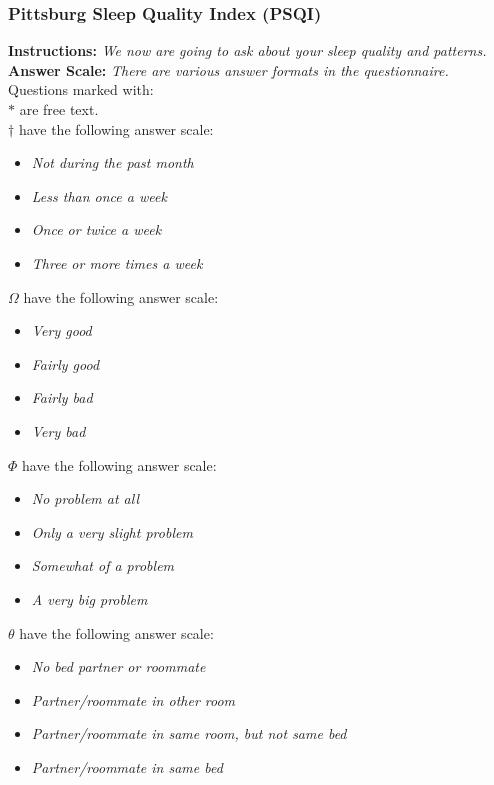 \subsubsection{Pittsburg Sleep Quality Index (PSQI)}
\textbf{Instructions:} \emph{We now are going to ask about your sleep quality and patterns.}
\\
\textbf{Answer Scale:} \emph{There are various answer formats in the questionnaire.} Questions marked with:
\\
$\ast$ are free text.
\\
$\dagger$ have the following answer scale:
\begin{itemize}
    \item \emph{Not during the past month}
    \item \emph{Less than once a week}
    \item \emph{Once or twice a week}
    \item \emph{Three or more times a week}
\end{itemize}
$\Omega$ have the following answer scale:
\begin{itemize}
    \item \emph{Very good}
    \item \emph{Fairly good}
    \item \emph{Fairly bad}
    \item \emph{Very bad}
\end{itemize}
$\Phi$ have the following answer scale:
\begin{itemize}
    \item \emph{No problem at all}
    \item \emph{Only a very slight problem}
    \item \emph{Somewhat of a problem}
    \item \emph{A very big problem}
\end{itemize}
$\theta$ have the following answer scale:
\begin{itemize}
    \item \emph{No bed partner or roommate}
    \item \emph{Partner/roommate in other room}
    \item \emph{Partner/roommate in same room, but not same bed}
    \item \emph{Partner/roommate in same bed}
\end{itemize}
